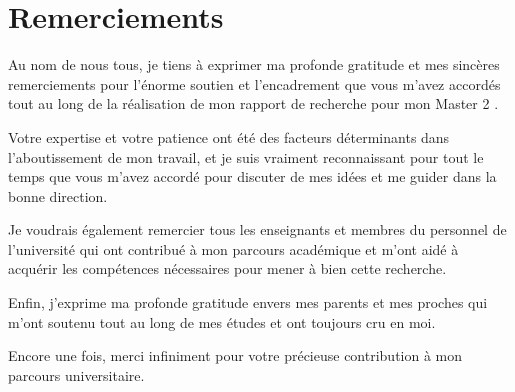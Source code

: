 \chapter*{Remerciements}

Au nom de nous tous, je tiens à exprimer ma profonde gratitude et mes sincères remerciements pour l'énorme soutien et l'encadrement que vous m'avez accordés tout au long de la réalisation de mon rapport de recherche pour mon Master 2 .

Votre expertise et votre patience ont été des facteurs déterminants dans l'aboutissement de mon travail, et je suis vraiment reconnaissant pour tout le temps que vous m'avez accordé pour discuter de mes idées et me guider dans la bonne direction.

Je voudrais également remercier tous les enseignants et membres du personnel de l'université qui ont contribué à mon parcours académique et m'ont aidé à acquérir les compétences nécessaires pour mener à bien cette recherche.

Enfin, j'exprime ma profonde gratitude envers mes parents et mes proches qui m'ont soutenu tout au long de mes études et ont toujours cru en moi.

Encore une fois, merci infiniment pour votre précieuse contribution à mon parcours universitaire.



